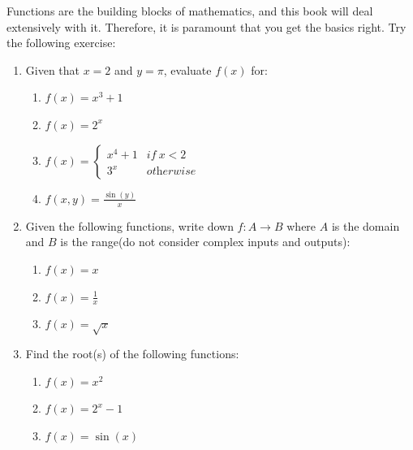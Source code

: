   Functions are the building blocks of mathematics, and this book will deal extensively with it. Therefore, it is paramount that you get the basics right. Try the following exercise:
  \begin{Exercise}
    \begin{enumerate}
    \item{Given that \(x=2\) and \(y=\pi\), evaluate \(f(x)\) for:
    \begin{enumerate}
      \item{\(f(x)=x^3+1\)}
      \item{\(f(x)=2^x\)}
      \item{\(f(x)= \begin{cases}
            x^4+1 & \textit{if} \ x<2 \\
            3^x & \textit{otherwise}
      \end{cases}\)}
    \item{\(f(x,y)=\frac{\sin(y)}{x}\)}
    \end{enumerate}} 
  \item{Given the following functions, write down \(f:A \to B\) where \(A\) is the domain and \(B\) is the range(do not consider complex inputs and outputs):
      \begin{enumerate}
        \item{\(f(x)=x\) }
        \item{\(f(x)=\frac{1}{x}\)}
        \item{\(f(x)=\sqrt{x}\)}
      \end{enumerate}
    }
  \item{Find the root(s) of the following functions:
      \begin{enumerate}
        \item{\(f(x)=x^2\)} 
        \item{\(f(x)=2^x-1\)}
        \item{\(f(x)=\sin(x)\)}
      \end{enumerate}
    }
  \end{enumerate}
  \end{Exercise}

